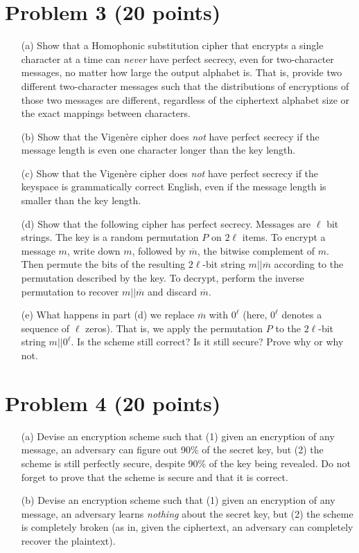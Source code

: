\section{Problem 3 (20 points)}

\begin{itemize}
	\item[(a)] Show that a Homophonic substitution cipher that encrypts a single character at a time can \emph{never} have perfect secrecy, even for two-character messages, no matter how large the output alphabet is.  That is, provide two different two-character messages such that the distributions of encryptions of those two messages are different, regardless of the ciphertext alphabet size or the exact mappings between characters.  
	\item[(b)] Show that the Vigen\`ere cipher does \emph{not} have perfect secrecy if the message length is even one character longer than the key length. 
	\item[(c)] Show that the Vigen\`ere cipher does \emph{not} have perfect secrecy if the keyspace is grammatically correct English, even if the message length is smaller than the key length.
	\item[(d)] Show that the following cipher has perfect secrecy.  Messages are $\ell$ bit strings.  The key is a random permutation $P$ on $2\ell$ items.  To encrypt a message $m$, write down $m$, followed by $\overline{m}$, the bitwise complement of $m$.  Then permute the bits of the resulting $2\ell$-bit string $m||\overline{m}$ according to the permutation described by the key. To decrypt, perform the inverse permutation to recover $m||\overline{m}$ and discard $\overline{m}$.
	\item[(e)] What happens in part (d) we replace $\overline{m}$ with $0^\ell$ (here, $0^\ell$ denotes a sequence of $\ell$ zeros). That is, we apply the permutation $P$ to the $2\ell$-bit string $m||0^\ell$. Is the scheme still correct? Is it still secure? Prove why or why not.
\end{itemize}



\section{Problem 4 (20 points)}

\begin{itemize}
	\item[(a)] Devise an encryption scheme such that (1) given an encryption of any message, an adversary can figure out 90\% of the secret key, but (2) the scheme is still perfectly secure, despite 90\% of the key being revealed.  Do not forget to prove that the scheme is secure and that it is correct.
	\item[(b)] Devise an encryption scheme such that (1) given an encryption of any message, an adversary learns \emph{nothing} about the secret key, but (2) the scheme is completely broken (as in, given the ciphertext, an adversary can completely recover the plaintext).
\end{itemize}


